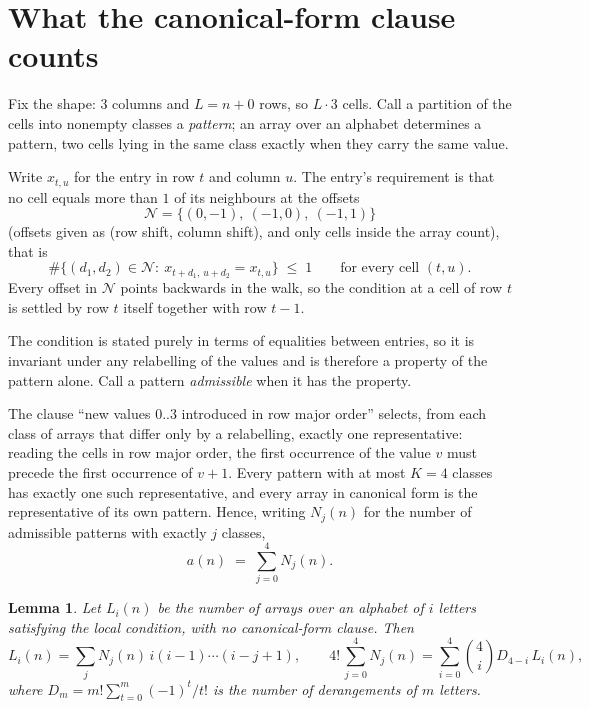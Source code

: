 \documentclass[11pt,a4paper]{article}
\theoremstyle{plain}
\newtheorem{lemma}[theorem]{Lemma}
\theoremstyle{definition}
\begin{document}
\section{What the canonical-form clause counts}

Fix the shape: $3$ columns and $L=n+0$ rows, so $L\cdot3$ cells. Call a
partition of the cells into nonempty classes a \emph{pattern}; an array over an alphabet
determines a pattern, two cells lying in the same class exactly when they carry the same
value.

Write $x_{t,u}$ for the entry in row $t$ and column $u$. The
entry's requirement is that no cell equals more than $1$ of its neighbours at the
offsets
\[
\mathcal N=\{(0,-1),\ (-1,0),\ (-1,1)\}
\]
(offsets given as (row shift, column shift), and only cells inside the array count),
that is
\begin{equation}\label{eq:loc}
\#\bigl\{(d_1,d_2)\in\mathcal N:\ x_{t+d_1,\,u+d_2}=x_{t,u}\bigr\}\;\le\;1
\qquad\text{for every cell }(t,u).
\end{equation}
Every offset in $\mathcal N$ points backwards in the walk, so the condition at a cell of
row $t$ is settled by row $t$ itself together with row $t-1$.

The condition is stated purely in terms of equalities between entries, so it is invariant
under any relabelling of the values and is therefore a property of the pattern alone. Call a
pattern \emph{admissible} when it has the property.

The clause ``new values $0..3$ introduced in row major order'' selects, from each class
of arrays that differ only by a relabelling, exactly one representative: reading the cells in
row major order, the first occurrence of the value $v$ must precede the first occurrence of
$v+1$. Every pattern with at most $K=4$ classes has exactly one such representative, and
every array in canonical form is the representative of its own pattern. Hence, writing
$N_j(n)$ for the number of admissible patterns with exactly $j$ classes,
\begin{equation}\label{eq:apat}
a(n)\;=\;\sum_{j=0}^{4}N_j(n).
\end{equation}

\begin{lemma}\label{lem:inv}
Let $L_i(n)$ be the number of arrays over an alphabet of $i$ letters satisfying the local
condition, with no canonical-form clause. Then
\[
L_i(n)=\sum_j N_j(n)\,i(i-1)\cdots(i-j+1),
\qquad
4!\,\sum_{j=0}^{4}N_j(n)=\sum_{i=0}^{4}\binom{4}{i}D_{4-i}\,L_i(n),
\]
where $D_m=m!\sum_{t=0}^{m}(-1)^t/t!$ is the number of derangements of $m$ letters.
\end{lemma}
\end{document}
